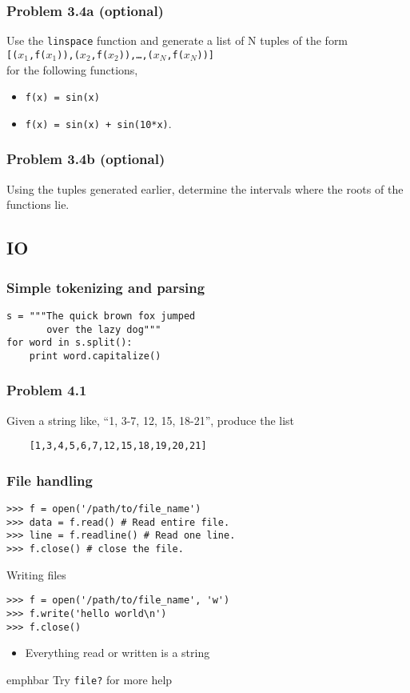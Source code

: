 \documentclass[14pt,compress]{beamer}
\newcommand{\emphbar}[1]
{\begin{beamercolorbox}[rounded=true]{emphbar} 
      {#1}
 \end{beamercolorbox}
}
\newcounter{time}
\newcommand{\inctime}[1]{\addtocounter{time}{#1}{\tiny \thetime\ m}}
\newcommand{\typ}[1]{\texttt{#1}}
\begin{document}
\begin{frame}[fragile]
  \frametitle{Problem 3.4a (optional)}

Use the \typ{linspace} function and generate a list of N tuples of the form\\
\typ{[($x_1$,f($x_1$)),($x_2$,f($x_2$)),\ldots,($x_N$,f($x_N$))]}\\for the following functions,\begin{itemize}
  \item \typ{f(x) = sin(x)}
  \item \typ{f(x) = sin(x) + sin(10*x)}.
\end{itemize}
\end{frame}

\begin{frame}[fragile]
  \frametitle{Problem 3.4b (optional)}

  Using the tuples generated earlier, determine the intervals where the roots of the functions lie.

  \inctime{15}
\end{frame}


\subsection{IO}

\begin{frame}[fragile]
  \frametitle{Simple tokenizing and parsing}
  \begin{lstlisting}
s = """The quick brown fox jumped
       over the lazy dog"""
for word in s.split():
    print word.capitalize()
  \end{lstlisting}
\end{frame}

\begin{frame}[fragile]
  \frametitle{Problem 4.1}
  Given a string like, ``1, 3-7, 12, 15, 18-21'', produce the list \\
  \begin{lstlisting}
    [1,3,4,5,6,7,12,15,18,19,20,21]
  \end{lstlisting}
\end{frame}

\begin{frame}[fragile]
  \frametitle{File handling}
\begin{lstlisting}
>>> f = open('/path/to/file_name')
>>> data = f.read() # Read entire file.
>>> line = f.readline() # Read one line.
>>> f.close() # close the file.
\end{lstlisting}
Writing files
\begin{lstlisting}
>>> f = open('/path/to/file_name', 'w')
>>> f.write('hello world\n')
>>> f.close()
\end{lstlisting}
\begin{itemize}
    \item Everything read or written is a string
\end{itemize}
\emphbar{Try \typ{file?} for more help}
\end{frame}
\end{document}

